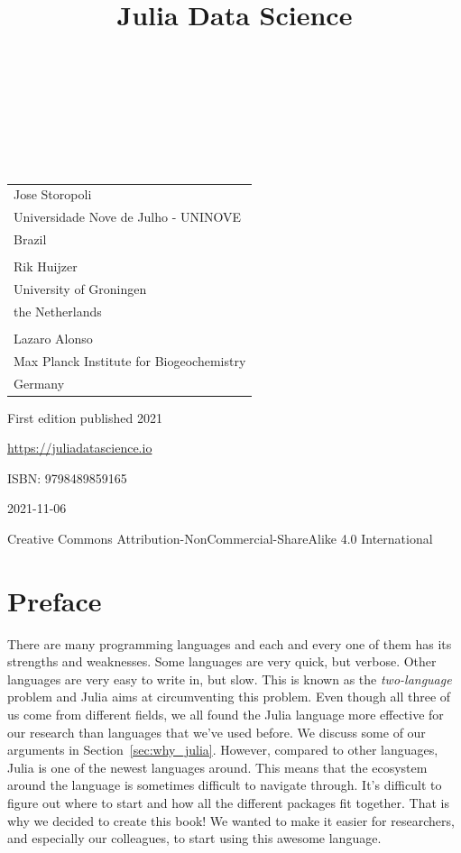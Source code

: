 \documentclass[
  notoc %
]{tufte-book}
\title{Julia Data Science}
\author{\noindent{Jose Storopoli}\\[3mm] \noindent{Rik
Huijzer}\\[3mm] \noindent{Lazaro Alonso}\\[3mm] }
\date{}
\begin{document}
\makeatletter
\thispagestyle{empty}
\vfill
{\Huge\bf
\noindent
\@title
}\\[1in]
{\Large
\noindent
\@author
}
\makeatother

\makeatletter
\newpage
\thispagestyle{empty}
\vfill
{\noindent
\begin{tabular}{l} Jose Storopoli\\ Universidade Nove de Julho - UNINOVE\\ Brazil\\ \\ Rik Huijzer\\ University of Groningen\\ the Netherlands\\ \\ Lazaro Alonso\\ Max Planck Institute for Biogeochemistry\\ Germany \end{tabular}
}
\vfill
{\small
First edition published 2021

\url{https://juliadatascience.io}

ISBN: 9798489859165

2021-11-06

Creative Commons Attribution-NonCommercial-ShareAlike 4.0 International
}
\makeatother


\frontmatter
\mainmatter

\setcounter{tocdepth}{1}
\tableofcontents

\justifying

\setlength{\parindent}{0pt}

\hypertarget{sec:preface}{%
\chapter{Preface}\label{sec:preface}}

There are many programming languages and each and every one of them has
its strengths and weaknesses. Some languages are very quick, but
verbose. Other languages are very easy to write in, but slow. This is
known as the \emph{two-language} problem and Julia aims at circumventing
this problem. Even though all three of us come from different fields, we
all found the Julia language more effective for our research than
languages that we've used before. We discuss some of our arguments in
Section~\ref{sec:why_julia}. However, compared to other languages, Julia
is one of the newest languages around. This means that the ecosystem
around the language is sometimes difficult to navigate through. It's
difficult to figure out where to start and how all the different
packages fit together. That is why we decided to create this book! We
wanted to make it easier for researchers, and especially our colleagues,
to start using this awesome language.
\end{document}
